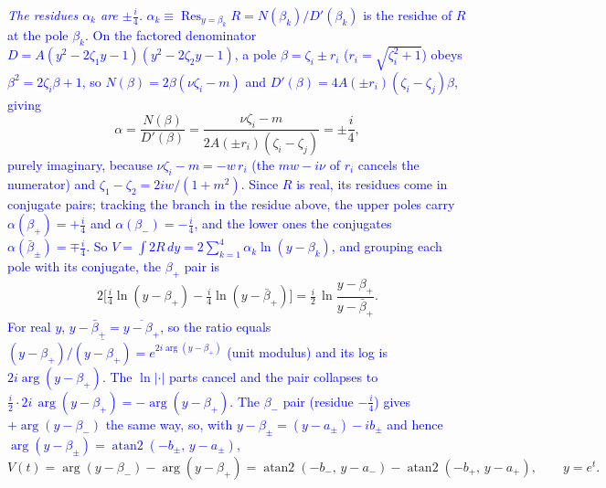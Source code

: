 \documentclass[11pt]{article}
\numberwithin{equation}{section}
\newcommand{\cam}[1]{\textcolor{blue}{#1}}
\begin{document}
\cam{\emph{The residues $\alpha_k$ are $\pm\tfrac i4$.} $\alpha_k\equiv\operatorname{Res}_{y=\beta_k}R
=N(\beta_k)/D'(\beta_k)$ is the residue of $R$ at the pole $\beta_k$. On the factored denominator
$D=A(y^2-2\zeta_1y-1)(y^2-2\zeta_2y-1)$, a pole $\beta=\zeta_i\pm r_i$ ($r_i=\sqrt{\zeta_i^2+1}$) obeys
$\beta^2=2\zeta_i\beta+1$, so $N(\beta)=2\beta(\nu\zeta_i-m)$ and $D'(\beta)=4A(\pm r_i)(\zeta_i-\zeta_j)\beta$,
giving}
\[
  \alpha=\frac{N(\beta)}{D'(\beta)}=\frac{\nu\zeta_i-m}{2A(\pm r_i)(\zeta_i-\zeta_j)}=\pm\frac{i}{4},
\]
\cam{purely imaginary, because $\nu\zeta_i-m=-w\,r_i$ (the $mw-i\nu$ of $r_i$ cancels the numerator) and
$\zeta_1-\zeta_2=2iw/(1+m^2)$.}
\cam{Since $R$ is real, its residues come in conjugate pairs; tracking the branch in the residue above,
the upper poles carry $\alpha(\beta_+)=+\tfrac i4$ and $\alpha(\beta_-)=-\tfrac i4$, and the lower ones the
conjugates $\alpha(\bar\beta_\pm)=\mp\tfrac i4$. So $V=\int 2R\,dy=2\sum_{k=1}^4\alpha_k\ln(y-\beta_k)$, and
grouping each pole with its conjugate, the $\beta_+$ pair is}
\[
  2\big[\tfrac i4\ln(y-\beta_+)-\tfrac i4\ln(y-\bar\beta_+)\big]=\tfrac i2\,\ln\frac{y-\beta_+}{y-\bar\beta_+}.
\]
\cam{For real $y$, $y-\bar\beta_+=\overline{y-\beta_+}$, so the ratio equals $(y-\beta_+)/\overline{(y-\beta_+)}
=e^{2i\arg(y-\beta_+)}$ (unit modulus) and its log is $2i\arg(y-\beta_+)$. The $\ln|\cdot|$ parts cancel and
the pair collapses to $\tfrac i2\cdot 2i\,\arg(y-\beta_+)=-\arg(y-\beta_+)$. The $\beta_-$ pair (residue
$-\tfrac i4$) gives $+\arg(y-\beta_-)$ the same way, so, with $y-\beta_\pm=(y-a_\pm)-ib_\pm$ and hence
$\arg(y-\beta_\pm)=\operatorname{atan2}(-b_\pm,\,y-a_\pm)$,}
\begin{equation}\label{eq:Vtwoarctan}
  V(t)=\arg(y-\beta_-)-\arg(y-\beta_+)
  =\operatorname{atan2}(-b_-,\,y-a_-)-\operatorname{atan2}(-b_+,\,y-a_+),\qquad y=e^t .
\end{equation}
\end{document}
